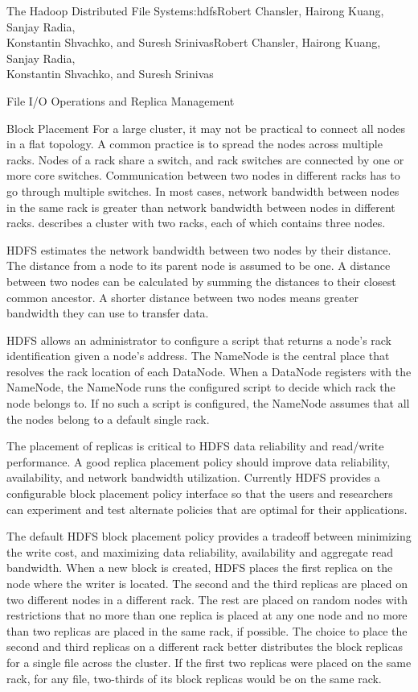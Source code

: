 \begin{aosachaptertoc}{The Hadoop Distributed File System}{s:hdfs}{Robert Chansler, Hairong Kuang, Sanjay Radia, \\ Konstantin Shvachko, and Suresh Srinivas}{Robert Chansler, Hairong Kuang, Sanjay Radia, \\ \hspace*{0.9cm} Konstantin Shvachko, and Suresh Srinivas}
\begin{aosasect1}{File I/O Operations and Replica Management}
\begin{aosasect2}{Block Placement}
For a large cluster, it may not be practical to connect all nodes in a
flat topology. A common practice is to spread the nodes across
multiple racks. Nodes of a rack share a switch, and rack switches are
connected by one or more core switches. Communication between two
nodes in different racks has to go through multiple switches. In most
cases, network bandwidth between nodes in the same rack is greater
than network bandwidth between nodes in different racks.
 describes a cluster with two racks, each of
which contains three nodes.


HDFS estimates the network bandwidth between two nodes by their
distance. The distance from a node to its parent node is assumed to be
one. A distance between two nodes can be calculated by summing the
distances to their closest common ancestor.  A shorter distance
between two nodes means greater bandwidth they can use to transfer
data.

HDFS allows an administrator to configure a script that returns a
node's rack identification given a node's address. The NameNode is the
central place that resolves the rack location of each DataNode. When a
DataNode registers with the NameNode, the NameNode runs the configured
script to decide which rack the node belongs to. If no such a script
is configured, the NameNode assumes that all the nodes belong to a
default single rack.

The placement of replicas is critical to HDFS data reliability and
read/write performance. A good replica placement policy should improve
data reliability, availability, and network bandwidth
utilization. Currently HDFS provides a configurable block placement
policy interface so that the users and researchers can experiment and
test alternate policies that are optimal for their applications.

The default HDFS block placement policy provides a tradeoff between
minimizing the write cost, and maximizing data reliability,
availability and aggregate read bandwidth. When a new block is
created, HDFS places the first replica on the node where the writer is
located. The second and the third replicas are placed on two different
nodes in a different rack. The rest are placed on random nodes with
restrictions that no more than one replica is placed at any one node
and no more than two replicas are placed in the same rack, if
possible. The choice to place the second and third replicas on a
different rack better distributes the block replicas for a single file
across the cluster. If the first two replicas were placed on the same
rack, for any file, two-thirds of its block replicas would be on the
same rack.


\end{aosasect2}
\end{aosasect1}
\end{aosachaptertoc}
